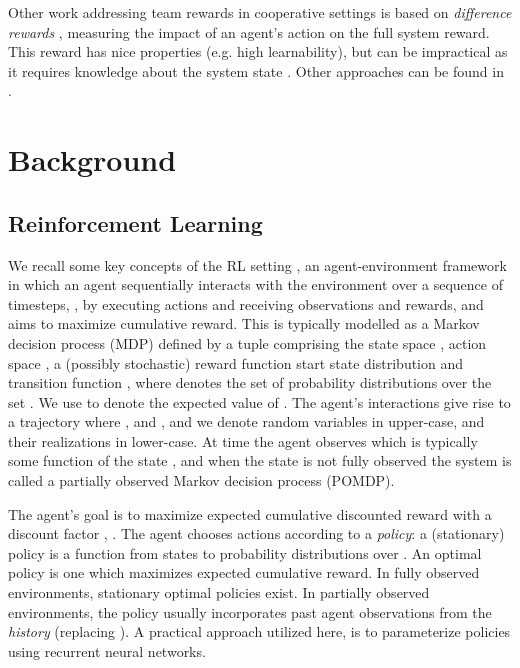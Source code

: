 \documentclass{article}
\begin{document}
Other work addressing team rewards in cooperative  settings is based on \textit{difference rewards} \citep{tumer-wolpert_cdcs04}, measuring the impact of an agent's action on the full system reward. This reward has nice properties (e.g. high learnability), but can be impractical as it requires knowledge about the system state \citep{tumer-colby_aamas16,tumer-agogino_jaamas08,tumer-proper_aamas12}. Other approaches can be found in \citet{tumer-devlin_aamas14,tumer-holmesparker_ker14,BabesCL08}.





\section{Background}


\subsection{Reinforcement Learning}


We recall some key concepts of the RL setting \citep{SB98}, an agent-environment framework \citep{RN10} in which an agent sequentially interacts with the environment over a sequence of timesteps, , by executing actions and receiving observations and rewards, and aims to maximize cumulative reward. This is typically modelled as a Markov decision process (MDP) \citep[e.g.][]{puterman} defined by a tuple  comprising the state space , action space , a (possibly stochastic) reward function  start state distribution  and transition function , where  denotes the set of probability distributions over the set . We use  to denote the expected value of . The agent's interactions give rise to a trajectory  where ,  and , and we denote random variables in upper-case, and their realizations in lower-case. At time  the agent observes  which is typically some function of the state , and when the state is not fully observed the system is called a partially observed Markov decision process (POMDP).

\iffalse
If the Markov property   is satisfied, then the environment is called a Markov Decision Process (MDP) and the observations  can be viewed as states . It is always possible to trivially satisfy the Markov property by letting .
\fi

The agent's goal is to maximize expected cumulative discounted reward with a discount factor , . The agent chooses actions according to a \emph{policy}: a (stationary)  policy is a function  from states to probability distributions over . An optimal policy is one which maximizes expected cumulative reward. In fully observed environments, stationary optimal policies exist. In partially observed environments, the policy usually incorporates past agent observations from the \emph{history}  (replacing ). A practical approach utilized here, is to parameterize policies using recurrent neural networks.
\end{document}
